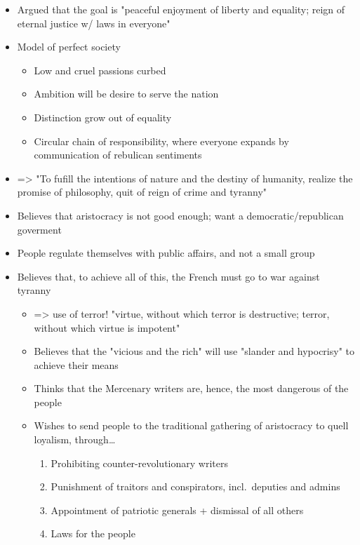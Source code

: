 \documentclass[letterpaper]{article}
\begin{document}
\begin{itemize}
\item Argued that the goal is "peaceful enjoyment of liberty and equality;
reign of eternal justice w/ laws in everyone"
\item Model of perfect society

\begin{itemize}
\item Low and cruel passions curbed
\item Ambition will be desire to serve the nation
\item Distinction grow out of equality
\item Circular chain of responsibility, where everyone expands by
communication of rebulican sentiments
\end{itemize}

\item => "To fufill the intentions of nature and the destiny of humanity,
realize the promise of philosophy, quit of reign of crime and tyranny"
\item Believes that aristocracy is not good enough; want a
democratic/republican goverment
\item People regulate themselves with public affairs, and not a small group
\item Believes that, to achieve all of this, the French must go to war
against tyranny

\begin{itemize}
\item => use of terror! "virtue, without which terror is destructive;
terror, without which virtue is impotent"
\item Believes that the "vicious and the rich" will use "slander and
hypocrisy" to achieve their means
\item Thinks that the Mercenary writers are, hence, the most dangerous of
the people
\item Wishes to send people to the traditional gathering of aristocracy to
quell loyalism, through\ldots{}

\begin{enumerate}
\item Prohibiting counter-revolutionary writers
\item Punishment of traitors and conspirators, incl. deputies and
admins
\item Appointment of patriotic generals + dismissal of all others
\item Laws for the people
\end{enumerate}
\end{itemize}
\end{itemize}
\end{document}
